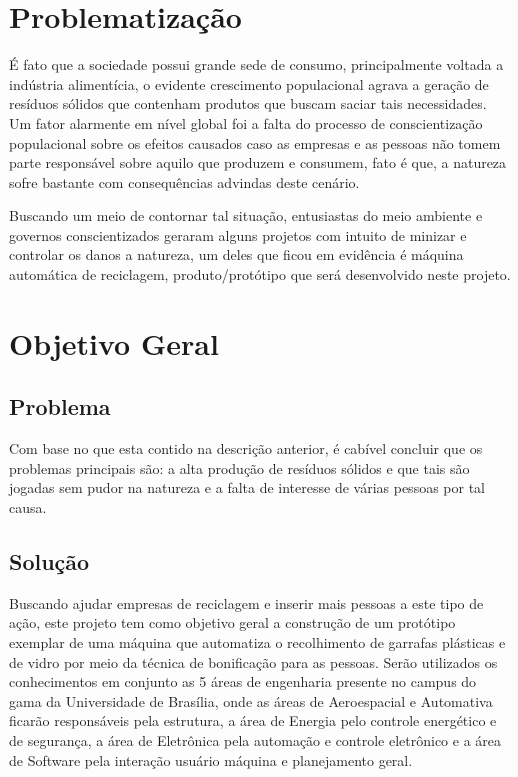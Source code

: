 \section{Problematização}

É fato que a sociedade possui grande sede de consumo, principalmente voltada a indústria alimentícia, o evidente crescimento populacional agrava a geração de resíduos sólidos que contenham produtos que buscam saciar tais necessidades. Um fator alarmente em nível global foi a falta do processo de conscientização populacional sobre os efeitos causados caso as empresas e as pessoas não tomem parte responsável sobre aquilo que produzem e consumem, fato é que, a natureza sofre bastante com consequências advindas deste cenário.

Buscando um meio de contornar tal situação, entusiastas do meio ambiente e governos conscientizados geraram alguns projetos com intuito de minizar e controlar os danos a natureza, um deles que ficou em evidência é máquina automática de reciclagem, produto/protótipo que será desenvolvido neste projeto.

\section{Objetivo Geral}

\subsection{Problema}
Com base no que esta contido na descrição anterior, é cabível concluir que os problemas principais são: a alta produção de resíduos sólidos e que tais são jogadas sem pudor na natureza e a falta de interesse de várias pessoas por tal causa.  

\subsection{Solução}
Buscando ajudar empresas de reciclagem e inserir mais pessoas a este tipo de ação, este projeto tem como objetivo geral a construção de um protótipo exemplar de uma máquina que automatiza o recolhimento de garrafas plásticas e de vidro por meio da técnica de bonificação para as pessoas. Serão utilizados os conhecimentos em conjunto as 5 áreas de engenharia presente no campus do gama da Universidade de Brasília, onde as áreas de Aeroespacial e Automativa ficarão responsáveis pela estrutura, a área de Energia pelo controle energético e de segurança, a área de Eletrônica pela automação e controle eletrônico e a área de Software pela interação usuário máquina e planejamento geral.

